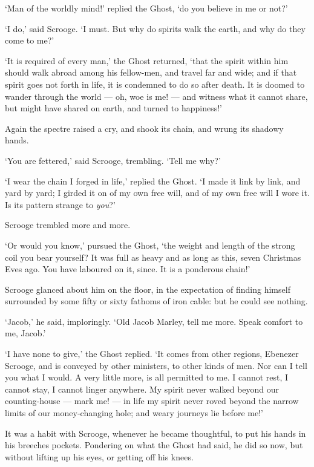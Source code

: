 \documentclass[11pt,twoside]{article}\makeatletter
\begin{document}
‘Man of the worldly mind!’ replied the Ghost, ‘do you believe in me or not?’\par
‘I do,’ said Scrooge. ‘I must. But why do spirits walk the earth, and why do they come to me?’\par
‘It is required of every man,’ the Ghost returned, ‘that the spirit within him should walk abroad among his fellow-men, and travel far and wide; and if that spirit goes not forth in life, it is condemned to do so after death. It is doomed to wander through the world — oh, woe is me! — and witness what it cannot share, but might have shared on earth, and turned to happiness!’\par
Again the spectre raised a cry, and shook its chain, and wrung its shadowy hands. \par
‘You are fettered,’ said Scrooge, trembling. ‘Tell me why?’\par
‘I wear the chain I forged in life,’ replied the Ghost. ‘I made it link by link, and yard by yard; I girded it on of my own free will, and of my own free will I wore it. Is its pattern strange to \textit{you}?’\par
Scrooge trembled more and more. \par
‘Or would you know,’ pursued the Ghost, ‘the weight and length of the strong coil you bear yourself? It was full as heavy and as long as this, seven Christmas Eves ago. You have laboured on it, since. It is a ponderous chain!’\par
Scrooge glanced about him on the floor, in the expectation of finding himself surrounded by some fifty or sixty fathoms of iron cable: but he could see nothing.\par
‘Jacob,’ he said, imploringly. ‘Old Jacob Marley, tell me more. Speak comfort to me, Jacob.’\par
‘I have none to give,’ the Ghost replied. ‘It comes from other regions, Ebenezer Scrooge, and is conveyed by other ministers, to other kinds of men. Nor can I tell you what I would. A very little more, is all permitted to me. I cannot rest, I cannot stay, I cannot linger anywhere. My spirit never walked beyond our counting-house — mark me! — in life my spirit never roved beyond the narrow limits of our money-changing hole; and weary journeys lie before me!’\par
It was a habit with Scrooge, whenever he became thoughtful, to put his hands in his breeches pockets. Pondering on what the Ghost had said, he did so now, but without lifting up his eyes, or getting off his knees. \par
\end{document}
